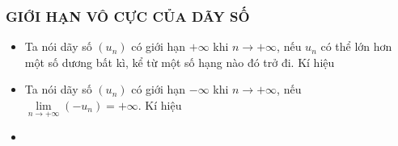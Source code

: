 \subsubsection{GIỚI HẠN VÔ CỰC CỦA DÃY SỐ}
\begin{itemize}
	\item [\iconMT]  Ta nói dãy số $(u_n)$ có giới hạn $+\infty$ khi $n\to +\infty$, nếu $u_n$ có thể lớn hơn một số dương bất kì, kể từ một số hạng nào đó trở đi.	Kí hiệu
	\item [\iconMT]  Ta nói dãy số $(u_n)$ có giới hạn $-\infty$ khi $n\to +\infty$, nếu $\lim\limits_{n \to +\infty}(-u_n)=+\infty$. Kí hiệu
	\item [\iconMT] 
	\begin{khung}
	\end{khung}
		 

\end{itemize}
